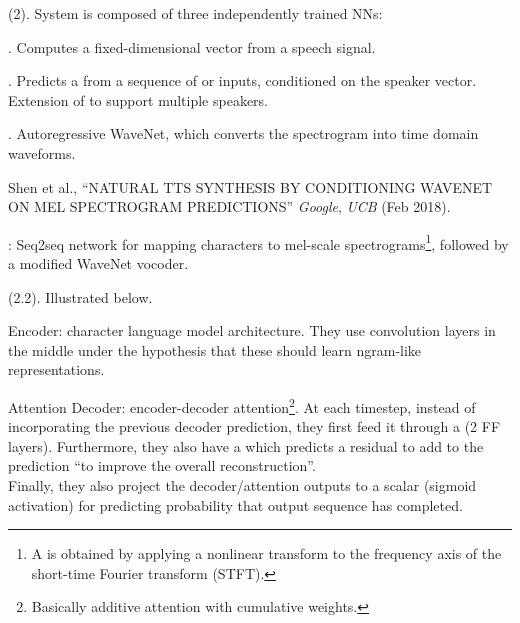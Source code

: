 \documentclass[11pt]{article}
\begin{document}
 (2). System is composed of three independently trained NNs:
\begin{compactenum}
	\item {}. Computes a fixed-dimensional vector from a speech signal.
	
	\item {}. Predicts a  from a sequence of  or  inputs, conditioned on the speaker vector. Extension of  to support multiple speakers.
	
	\item {}. Autoregressive WaveNet, which converts the spectrogram into time domain waveforms.
\end{compactenum}


\vspace{-1em}
{\footnotesize Shen et al., ``NATURAL TTS SYNTHESIS BY CONDITIONING WAVENET ON MEL SPECTROGRAM PREDICTIONS'' \textit{Google}, \textit{UCB} (Feb 2018).}

: Seq2seq network for mapping characters to mel-scale spectrograms\footnote{A  is obtained by applying a nonlinear transform to the frequency axis of the short-time Fourier transform (STFT).}, followed by a modified WaveNet vocoder. 


 (2.2). Illustrated below.

\begin{compactitem}
	\item Encoder: character language model architecture. They use convolution layers in the middle under the hypothesis that these should learn ngram-like representations. 
	
	\item Attention Decoder:  encoder-decoder attention\footnote{Basically additive attention with cumulative weights.}. At each timestep, instead of incorporating the previous decoder prediction, they first feed it through a  (2 FF layers). Furthermore, they also have a  which predicts a residual to add to the prediction ``to improve the overall reconstruction''. \\
	
	Finally, they also project the decoder/attention outputs to a scalar (sigmoid activation) for predicting probability that output sequence has completed.
	
\end{compactitem}
\end{document}
